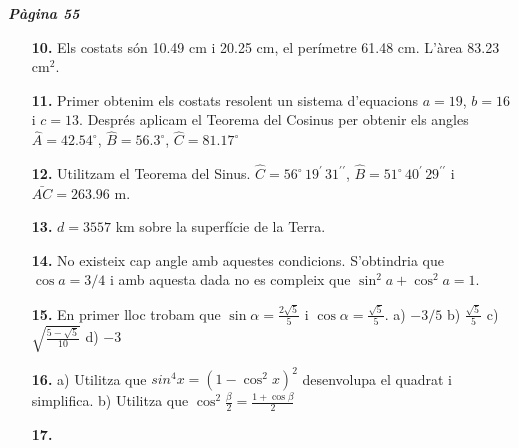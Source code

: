 \documentclass[a4paper, pdf, twoside]{book}
\begin{document}
\begin{multicols}{2}
{\textbf{\em Pàgina 55}} \hrulefill
\begin{enumerate}
\vspace{0.25cm}
\item[\fontfamily{phv}\selectfont\color{blue}\textbf{10. }]  \scalebox{0.6}{\simbolclau } 
Els costats són 10.49 cm i 20.25 cm, el perímetre 61.48 cm. L'àrea 83.23 cm$^2$.
 \end{enumerate}
\begin{enumerate}
\vspace{0.25cm}
\item[\fontfamily{phv}\selectfont\color{blue}\textbf{11. }]  \scalebox{0.6}{\simbolclau } 
Primer obtenim els costats resolent un sistema d'equacions $a=19$, $b=16$ i $c=13$. Després aplicam el Teorema del Cosinus per obtenir els angles $\hat A=42.54^\circ $, $\hat B=56.3^\circ $, $\hat C=81.17^\circ $
\vspace{0.25cm}
\item[\fontfamily{phv}\selectfont\color{blue}\textbf{12. }]  \scalebox{0.6}{\simbolclau } 
Utilitzam el Teorema del Sinus. $\hat C= 56^\circ \, 19^\prime \, 31^{\prime \prime }$, $\hat B= 51^\circ \, 40^\prime \, 29^{\prime \prime }$ i $\bar {AC}=263.96$ m.
\vspace{0.25cm}
\item[\fontfamily{phv}\selectfont\color{blue}\textbf{13. }]  \scalebox{0.6}{\simbolclau } 
$d=3557$ km sobre la superfície de la Terra.
\vspace{0.25cm}
\item[\fontfamily{phv}\selectfont\color{blue}\textbf{14. }]  \scalebox{0.6}{\simbolclau } 
No existeix cap angle amb aquestes condicions. S'obtindria que $\cos a = 3/4$ i amb aquesta dada no es compleix que $\sin ^2 a +\cos ^2 a = 1$.
\vspace{0.25cm}
\item[\fontfamily{phv}\selectfont\color{blue}\textbf{15. }]  \scalebox{0.6}{\simbolclau } 
En primer lloc trobam que $\sin \alpha = \frac {2\sqrt 5}{5}$ i $\cos \alpha = \frac {\sqrt 5}{5}$. a) $-3/5$ \quad b) $\frac {\sqrt 5}{5}$ \quad c) $\sqrt {\frac {5-\sqrt 5}{10}}$ \quad d) $-3$
\vspace{0.25cm}
\item[\fontfamily{phv}\selectfont\color{blue}\textbf{16. }]  \scalebox{0.6}{\simbolclau } 
a) Utilitza que $sin^4 x = (1-\cos ^2 x)^2$ desenvolupa el quadrat i simplifica. b) Utilitza que $\cos ^2 \frac {\beta }{2} = \frac {1+\cos \beta }{2}$ 
\vspace{0.25cm}
\item[\fontfamily{phv}\selectfont\color{blue}\textbf{17. }]  \scalebox{0.6}{\simbolclau } 

\end{enumerate}
\end{multicols}
\end{document}
